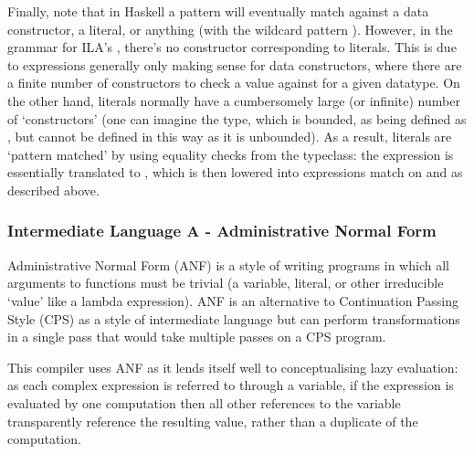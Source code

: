 \documentclass[dissertation.tex]{subfiles}
\begin{document}
{{{            

            Finally, note that in Haskell a pattern will eventually match against a data constructor, a literal, or
            anything (with the wildcard pattern \haskell{_}). However, in the grammar for ILA's
            , there's no constructor corresponding to literals. This is due to 
            expressions generally only making sense for data constructors, where there are a finite number of
            constructors to check a value against for a given datatype. On the other hand, literals normally have a
            cumbersomely large (or infinite) number of `constructors' (one can imagine the  type, which is
            bounded, as being defined as , but  cannot be
            defined in this way as it is unbounded). As a result, literals are `pattern matched' by using equality
            checks from the  typeclass: the expression  is
            essentially translated to , which is then lowered
            into  expressions match on  and  as described above.

        }
        \subsubsection{Intermediate Language A - Administrative Normal Form}
        {

            Administrative Normal Form (ANF) is a style of writing programs in which all arguments to functions must be
            trivial (a variable, literal, or other irreducible `value' like a lambda expression). ANF is an alternative
            to Continuation Passing Style (CPS) as a style of intermediate language but can perform transformations in a
            single pass that would take multiple passes on a CPS program\cite{ANF}.

            This compiler uses ANF as it lends itself well to conceptualising lazy evaluation: as each complex
            expression is referred to through a variable, if the expression is evaluated by one computation then all
            other references to the variable transparently reference the resulting value, rather than a duplicate of the
            computation.

}}}
\end{document}

